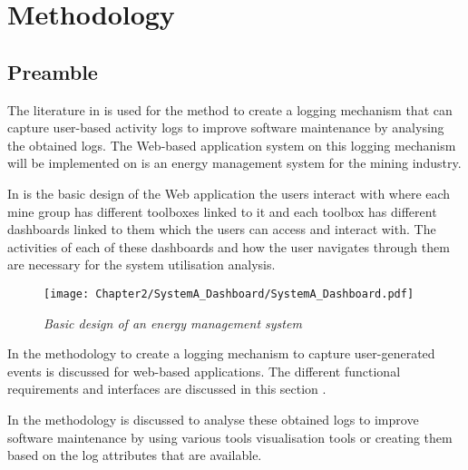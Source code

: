 \chapter{Methodology}
\label{chap:2}

\section{Preamble} The literature in  is used for the method to create a logging mechanism that can capture user-based activity logs to improve software maintenance by analysing the obtained logs. The Web-based application system on this logging mechanism will be implemented on is an energy management system for the mining industry.\par In  is the basic design of the Web application the users interact with where each mine group has different toolboxes linked to it and each toolbox has different dashboards linked to them which the users can access and interact with. The activities of each of these dashboards and how the user navigates through them are necessary for the system utilisation analysis.

\begin{figure}[!htb] %
	\centering %
	\texttt{[image: Chapter2/SystemA\_Dashboard/SystemA\_Dashboard.pdf]}
	\caption[Basic design of an energy management system]
	{\textit{Basic design of an energy management system}}\label{fig:ch2_webSystemBasic}
\end{figure}

In  the methodology to create a logging mechanism to capture user-generated events is discussed for web-based applications. The different functional requirements and interfaces are discussed in this section \cite{Anish2015}.\par In  the methodology is discussed to analyse these obtained logs to improve software maintenance by using various tools visualisation tools or creating them based on the log attributes that are available.

